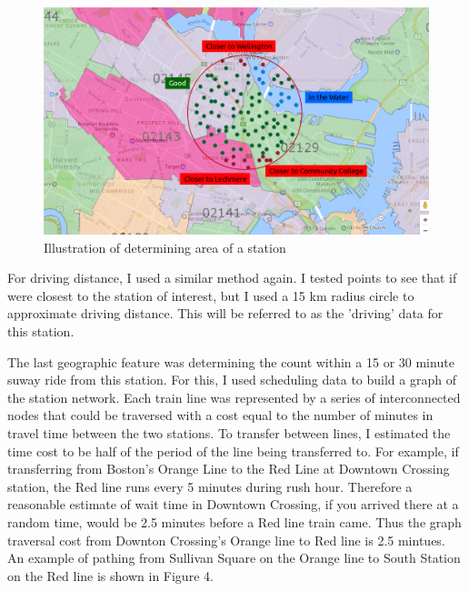 \documentclass{article}
\begin{document}
\begin{figure}[H]\label{fig:f3}
\begin{center}\includegraphics[scale=0.6]{area_with_markup}\end{center}
\caption{Illustration of determining area of a station}
\end{figure}

For driving distance, I used a similar method again. I tested points to see that if were closest to the station of interest, but I used a 15 km radius circle to approximate driving distance. This will be referred to as the 'driving' data for this station.

The last geographic feature was determining the count within a 15 or 30 minute suway ride from this station. For this, I used scheduling data to build a graph of the station network. Each train line was represented by a series of interconnected nodes that could be traversed with a cost equal to the number of minutes in travel time between the two stations. To transfer between lines, I estimated the time cost to be half of the period of the line being transferred to. For example, if transferring from Boston's Orange Line to the Red Line at Downtown Crossing station, the Red line runs every 5 minutes during rush hour. Therefore a reasonable estimate of wait time in Downtown Crossing, if you arrived there at a random time, would be 2.5 minutes before a Red line train came. Thus the graph traversal cost from Downton Crossing's Orange line to Red line is 2.5 mintues. An example of pathing from Sullivan Square on the Orange line to South Station on the Red line is shown in Figure 4. 
\end{document}
